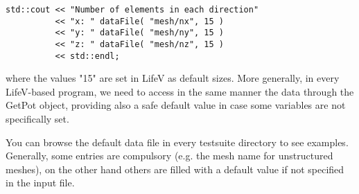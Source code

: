 \begin{lstlisting}
std::cout << "Number of elements in each direction" 
          << "x: " dataFile( "mesh/nx", 15 )
          << "y: " dataFile( "mesh/ny", 15 )
          << "z: " dataFile( "mesh/nz", 15 )
          << std::endl;
\end{lstlisting}
\noindent
where the values "15" are set in LifeV as default sizes. More generally, in every LifeV-based program, we need to access in the same manner the data through the GetPot object, providing also a safe default value in case some variables are not specifically set.

\noindent
You can browse the default data file in every testsuite directory to see examples. Generally, some entries are compulsory (e.g. the mesh name for unstructured meshes), on the other hand others are filled with a default value if not specified in the input file. \\




